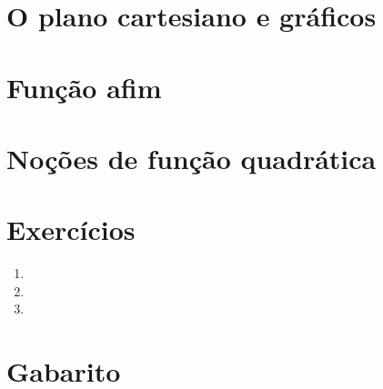 \documentclass[11pt,a4paper]{article}
\begin{document}
\section{O plano cartesiano e gráficos}

\section{Função afim}

\section{Noções de função quadrática}


\section{Exercícios}
\begin{enumerate}[label=\textbf{\arabic*.}]
  \item %
  \item %
  \item %
\end{enumerate}

\begin{desafio}
\end{desafio}

\section*{Gabarito}
\end{document}
